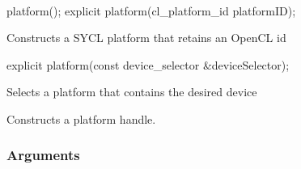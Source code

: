 \documentclass[letterpaper,10pt,english]{sphinxmanual}
\begin{document}
\begin{sphinxVerbatim}[commandchars=\\\{\}]
      
      
  
        
      
        
   
     
\end{sphinxVerbatim}


\paragraph{}
\label{\detokenize{programming-interface/runtime/platform:constructor}}\begin{sphinxalltt}
platform();
explicit platform(cl\_platform\_id platformID); \begin{footnote}[1]\sphinxAtStartFootnote
Constructs a SYCL platform that retains an OpenCL id
\end{footnote}
explicit platform(const device\_selector \&deviceSelector); \begin{footnote}[2]\sphinxAtStartFootnote
Selects a platform that contains the desired device
\end{footnote}
\end{sphinxalltt}

Constructs a platform handle.
\subsubsection*{Arguments}
\end{document}
